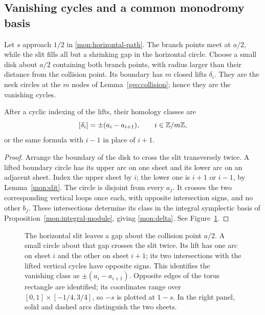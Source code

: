 \subsection{Vanishing cycles and a common monodromy basis}

Let $s$ approach $1/2$ in \eqref{mon:horizontal-path}.  The branch
points meet at $a/2$, while the slit fills all but a shrinking gap in
the horizontal circle.  Choose a small disk about $a/2$ containing
both branch points, with radius larger than their distance from the
collision point.  Its boundary has $m$ closed lifts $\delta_i$.
They are the neck circles at the $m$ nodes of
Lemma~\ref{geo:collision}; hence they are the vanishing cycles.

\begin{lemma}\label{mon:vanishing-classes}
After a cyclic indexing of the lifts, their homology classes are
\begin{equation}\label{mon:delta}
 [\delta_i]=\pm(a_i-a_{i+1}),\qquad i\in\mathbb Z/m\mathbb Z,
\end{equation}
or the same formula with $i-1$ in place of $i+1$.
\end{lemma}

\begin{proof}
Arrange the boundary of the disk to cross the slit transversely twice.
A lifted boundary circle has its upper arc on one sheet and its lower
arc on an adjacent sheet.  Index the upper sheet by $i$; the lower
one is $i+1$ or $i-1$, by Lemma~\ref{mon:slit}.  The circle is disjoint
from every $a_j$.  It crosses the two corresponding vertical loops
once each, with opposite intersection signs, and no other $b_j$.
These intersections determine its class in the integral symplectic
basis of Proposition~\ref{mon:integral-module}, giving
\eqref{mon:delta}.  See Figure~\ref{mon:slit-figure}.
\end{proof}

\begin{figure}[tb]
\centering

\caption{The horizontal slit leaves a gap about the collision point
$a/2$.  A small circle about that gap crosses the slit twice.  Its
lift has one arc on sheet $i$ and the other on sheet $i+1$; its two
intersections with the lifted vertical cycles have opposite signs.
This identifies the vanishing class as $\pm(a_i-a_{i+1})$.
Opposite edges of the torus rectangle are identified; its coordinates
range over $[0,1]\times[-1/4,3/4]$, so $-s$ is plotted at $1-s$.
In the right panel, solid and dashed arcs distinguish the two sheets.}
\label{mon:slit-figure}
\end{figure}

